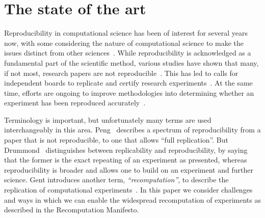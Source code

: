 \section{The state of the art}
\label{s:recomputation}

Reproducibility in computational science has been of interest for
several years now, with some considering the nature of computational
science to make the issues distinct from other
sciences~\cite{donoho:reproducible}. While reproducibility is
acknowledged as a fundamental part of the scientific method, various
studies have shown that many, if not most, research papers are not
reproducible~\cite{bonnet:repeatability,hornbaek:replications,ioannidis:repeatability}.
This has led to calls for independent boards to replicate and
certify research experiments~\cite{baker:verify}. At the same time,
efforts are ongoing to improve methodologies into determining whether
an experiment has been reproduced accurately~\cite{johnson:evidence}.

Terminology is important, but unfortunately many terms are used
interchangeably in this area.  Peng~\cite{peng:reproducible} describes
a spectrum of reproducibility from a paper that is not reproducible,
to one that allows ``full replication''. But
Drummond~\cite{drummond:replicability} distinguishes between
replicability and reproducibility, by saying that the former is the
exact repeating of an experiment as presented, whereas reproducibility
is broader and allows one to build on an experiment and further
science. Gent introduces another term, \emph{``recomputation''}, to describe
the replication of computational experiments~\cite{gent:recomputation}.
In this paper we consider challenges and ways in which we can enable
the widespread recomputation of experiments as described in the
Recomputation Manifesto.

